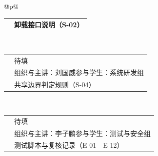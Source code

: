 \begin{longtable}{@{}p{\linewidth}@{}}
\begin{minipage}{\linewidth}
\begin{tabular}{@{}>{\raggedright\arraybackslash}p{}>{\raggedright\arraybackslash}p{}@{}}
\rowcolor{white} \TableHeaderText{形成材料} & 卸载接口说明（S-02） \\ \hline
\end{tabular}
\end{minipage} \\[6pt]
\begin{minipage}{\linewidth}
\begin{tabular}{@{}>{\raggedright\arraybackslash}p{}>{\raggedright\arraybackslash}p{}@{}}
\hline
\rowcolor{WordTableHeader}\multicolumn{2}{@{}p{\linewidth}@{}}{\RecordHeading{编号：T-06\quad 活动主题：内存共享机制：引用计数与写时复制}} \\ \hline
\rowcolor{white} \TableHeaderText{时间} & 待填 \\ \hline
\rowcolor{white} \TableHeaderText{组织与参与} & 组织与主讲：刘国威\newline 参与学生：系统研发组 \\ \hline
\rowcolor{white} \TableHeaderText{形成材料} & 共享边界判定规则（S-04） \\ \hline
\end{tabular}
\end{minipage} \\[6pt]
\begin{minipage}{\linewidth}
\begin{tabular}{@{}>{\raggedright\arraybackslash}p{}>{\raggedright\arraybackslash}p{}@{}}
\hline
\rowcolor{WordTableHeader}\multicolumn{2}{@{}p{\linewidth}@{}}{\RecordHeading{编号：T-07\quad 活动主题：测试方法与指标口径：基线、重复次数与数据复核}} \\ \hline
\rowcolor{white} \TableHeaderText{时间} & 待填 \\ \hline
\rowcolor{white} \TableHeaderText{组织与参与} & 组织与主讲：李子鹏\newline 参与学生：测试与安全组 \\ \hline
\rowcolor{white} \TableHeaderText{形成材料} & 测试脚本与复核记录（E-01---E-12） \\ \hline
\end{tabular}
\end{minipage} \\[6pt]
\begin{minipage}{\linewidth}
\begin{tabular}{@{}>{\raggedright\arraybackslash}p{}>{\raggedright\arraybackslash}p{}@{}}

\end{tabular}
\end{minipage}
\end{longtable}
